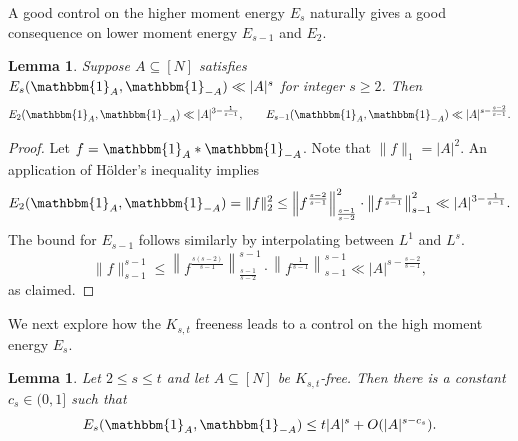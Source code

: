 \documentclass[A4paper,reqno,oneside,12pt]{amsart}
\theoremstyle{plain}
\newtheorem{lemma}[theorem]{Lemma}
\theoremstyle{definition}
\newcommand{\e}{\mathbbm{1}}          %
\begin{document}
A good control on the higher moment energy $E_s$ naturally gives a good consequence on lower moment energy $E_{s-1}$ and $E_2$. 
\begin{lemma}\label{lem: E2}
Suppose $A\subseteq [N]$ satisfies $E_s(\e_A,\e_{-A})\ll |A|^s$ for integer  $s\ge 2$. Then
\[
E_{2}(\e_A,\e_{-A})\ll |A|^{3-\frac{1}{s-1}},
\qquad
E_{s-1}(\e_A,\e_{-A})\ll |A|^{s-\frac{s-2}{s-1}}.
\]
\end{lemma}

\begin{proof}
Let $f=\e_A *\e_{-A}$. Note that $\|f\|_1=|A|^2$. An application of H\"older's inequality implies
\[ E_2(\e_A,\e_{-A}) = 
\|f\|^2_2\leq \left\|f^{\frac{s-2}{s-1}}\right\|^2_{\frac{s-1}{s-2}} \cdot \left\|f^{\frac{s}{s-1}}\right\|^2_{s-1}\ll |A|^{3-\frac{1}{s-1}}.
\]
The bound for $E_{s-1}$ follows similarly by interpolating between $L^1$ and $L^s$.
\[
\|f\|^{s-1}_{s-1}\leq \left\|f^{\frac{s(s-2)}{s-1}}\right\|^{s-1}_{\frac{s-1}{s-2}}\cdot \left\|f^{\frac{1}{s-1}}\right\|^{s-1}_{s-1}\ll |A|^{s-\frac{s-2}{s-1}},
\]
as claimed. 
\end{proof}

We next explore how the $K_{s, t}$ freeness leads to a control on the high moment energy $E_s$. 
\begin{lemma}\label{lem: E_s}
Let $2\le s\le t$ and let $A\subseteq [N]$ be $K_{s,t}$-free. Then there is a constant $c_s\in(0, 1]$ such that
\[
E_s(\e_A,\e_{-A})\leq t|A|^s+O(|A|^{s-c_s}). 
\]
\end{lemma}
\end{document}
